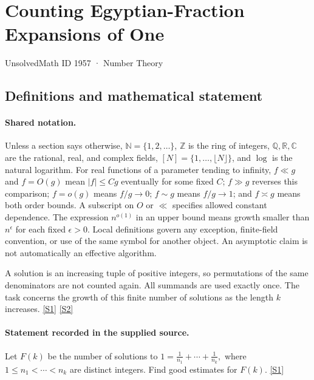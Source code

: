 \documentclass[11pt,a4paper]{article}
\newcommand{\N}{\mathbb{N}}
\newcommand{\Z}{\mathbb{Z}}
\newcommand{\Q}{\mathbb{Q}}
\newcommand{\R}{\mathbb{R}}
\newcommand{\C}{\mathbb{C}}
\newcommand{\sref}[2]{\hyperlink{source:#1:#2}{[S#2]}}
\begin{document}

\setcounter{section}{1956}

\section{Counting Egyptian-Fraction Expansions of One}\label{1957}

{\small\sffamily UnsolvedMath ID 1957 · Number Theory}

\subsection{Definitions and mathematical statement}

\paragraph{Shared notation.}Unless a section says otherwise, $\N=\{1,2,\ldots\}$,
$\Z$ is the ring of integers, $\Q,\R,\C$ are the rational, real, and complex
fields, $[N]=\{1,\ldots,\lfloor N\rfloor\}$, and $\log$ is the natural
logarithm. For real functions of a parameter tending to infinity,
$f\ll g$ and $f=O(g)$ mean $|f|\leq Cg$ eventually for some fixed $C$;
$f\gg g$ reverses this comparison; $f=o(g)$ means $f/g\to0$;
$f\sim g$ means $f/g\to1$; and $f\asymp g$ means both order bounds.
A subscript on $O$ or $\ll$ specifies allowed constant dependence.
The expression $n^{o(1)}$ in an upper bound means growth smaller than
$n^\epsilon$ for each fixed $\epsilon>0$. Local definitions govern any
exception, finite-field convention, or use of the same symbol for another
object. An asymptotic claim is not automatically an effective algorithm.



A solution is an increasing tuple of positive integers, so permutations of the same denominators are not counted again. All summands are used exactly once. The task concerns the growth of this finite number of solutions as the length $k$ increases. \sref{1957}{1} \sref{1957}{2}

\paragraph{Statement recorded in the supplied source.}
Let $F(k)$ be the number of solutions to $  1= \frac{1}{n_1}+\cdots+\frac{1}{n_k}, $ where $1\leq n_1<\cdots<n_k$ are distinct integers. Find good estimates for $F(k)$. \sref{1957}{1}
\end{document}
